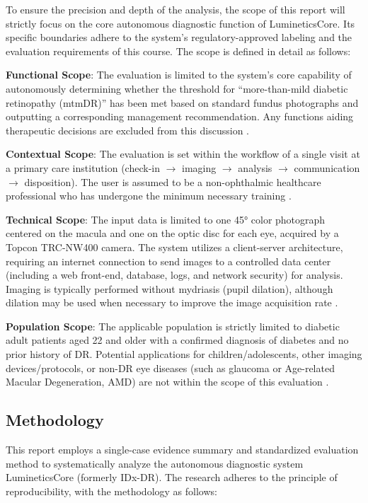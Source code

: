 \documentclass[sigplan,screen]{acmart}
\begin{document}
To ensure the precision and depth of the analysis, the scope of this report will strictly focus on the core autonomous diagnostic function of LumineticsCore. Its specific boundaries adhere to the system's regulatory-approved labeling and the evaluation requirements of this course. The scope is defined in detail as follows:

\textbf{Functional Scope}: The evaluation is limited to the system's core capability of autonomously determining whether the threshold for ``more-than-mild diabetic retinopathy (mtmDR)'' has been met based on standard fundus photographs and outputting a corresponding management recommendation. Any functions aiding therapeutic decisions are excluded from this discussion \cite{fda2018denovo_summary}.

\textbf{Contextual Scope}: The evaluation is set within the workflow of a single visit at a primary care institution (check-in $\rightarrow$ imaging $\rightarrow$ analysis $\rightarrow$ communication $\rightarrow$ disposition). The user is assumed to be a non-ophthalmic healthcare professional who has undergone the minimum necessary training \cite{digitaldiagnostics2024indications}.

\textbf{Technical Scope}: The input data is limited to one 45° color photograph centered on the macula and one on the optic disc for each eye, acquired by a Topcon TRC-NW400 camera. The system utilizes a client-server architecture, requiring an internet connection to send images to a controlled data center (including a web front-end, database, logs, and network security) for analysis. Imaging is typically performed without mydriasis (pupil dilation), although dilation may be used when necessary to improve the image acquisition rate \cite{fda2018denovo_summary}.

\textbf{Population Scope}: The applicable population is strictly limited to diabetic adult patients aged 22 and older with a confirmed diagnosis of diabetes and no prior history of DR. Potential applications for children/adolescents, other imaging devices/protocols, or non-DR eye diseases (such as glaucoma or Age-related Macular Degeneration, AMD) are not within the scope of this evaluation \cite{fda2018denovo_summary}.

\subsection{Methodology}

This report employs a single-case evidence summary and standardized evaluation method to systematically analyze the autonomous diagnostic system LumineticsCore (formerly IDx-DR). The research adheres to the principle of reproducibility, with the methodology as follows:
\end{document}
